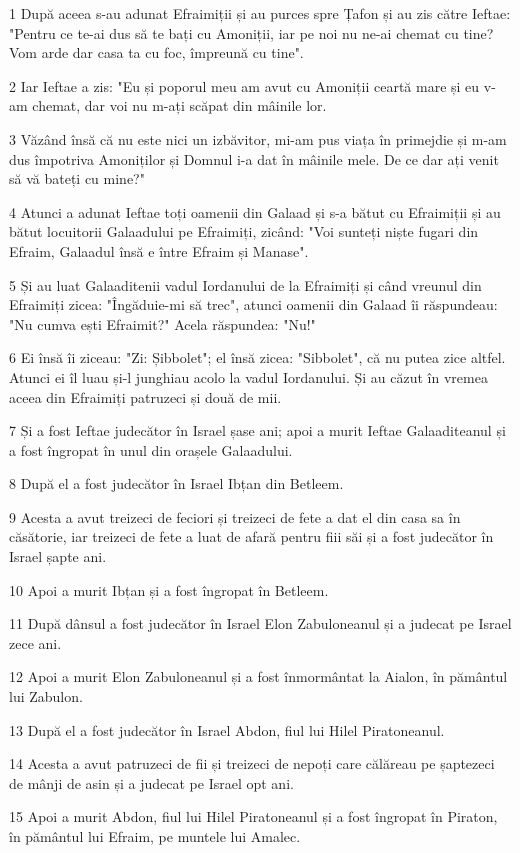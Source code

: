 \par 1 După aceea s-au adunat Efraimiții și au purces spre Țafon și au zis către Ieftae: "Pentru ce te-ai dus să te bați cu Amoniții, iar pe noi nu ne-ai chemat cu tine? Vom arde dar casa ta cu foc, împreună cu tine".
\par 2 Iar Ieftae a zis: "Eu și poporul meu am avut cu Amoniții ceartă mare și eu v-am chemat, dar voi nu m-ați scăpat din mâinile lor.
\par 3 Văzând însă că nu este nici un izbăvitor, mi-am pus viața în primejdie și m-am dus împotriva Amoniților și Domnul i-a dat în mâinile mele. De ce dar ați venit să vă bateți cu mine?"
\par 4 Atunci a adunat Ieftae toți oamenii din Galaad și s-a bătut cu Efraimiții și au bătut locuitorii Galaadului pe Efraimiți, zicând: "Voi sunteți niște fugari din Efraim, Galaadul însă e între Efraim și Manase".
\par 5 Și au luat Galaaditenii vadul Iordanului de la Efraimiți și când vreunul din Efraimiți zicea: "Îngăduie-mi să trec", atunci oamenii din Galaad îi răspundeau: "Nu cumva ești Efraimit?" Acela răspundea: "Nu!"
\par 6 Ei însă îi ziceau: "Zi: Șibbolet"; el însă zicea: "Sibbolet", că nu putea zice altfel. Atunci ei îl luau și-l junghiau acolo la vadul Iordanului. Și au căzut în vremea aceea din Efraimiți patruzeci și două de mii.
\par 7 Și a fost Ieftae judecător în Israel șase ani; apoi a murit Ieftae Galaaditeanul și a fost îngropat în unul din orașele Galaadului.
\par 8 După el a fost judecător în Israel Ibțan din Betleem.
\par 9 Acesta a avut treizeci de feciori și treizeci de fete a dat el din casa sa în căsătorie, iar treizeci de fete a luat de afară pentru fiii săi și a fost judecător în Israel șapte ani.
\par 10 Apoi a murit Ibțan și a fost îngropat în Betleem.
\par 11 După dânsul a fost judecător în Israel Elon Zabuloneanul și a judecat pe Israel zece ani.
\par 12 Apoi a murit Elon Zabuloneanul și a fost înmormântat la Aialon, în pământul lui Zabulon.
\par 13 După el a fost judecător în Israel Abdon, fiul lui Hilel Piratoneanul.
\par 14 Acesta a avut patruzeci de fii și treizeci de nepoți care călăreau pe șaptezeci de mânji de asin și a judecat pe Israel opt ani.
\par 15 Apoi a murit Abdon, fiul lui Hilel Piratoneanul și a fost îngropat în Piraton, în pământul lui Efraim, pe muntele lui Amalec.


